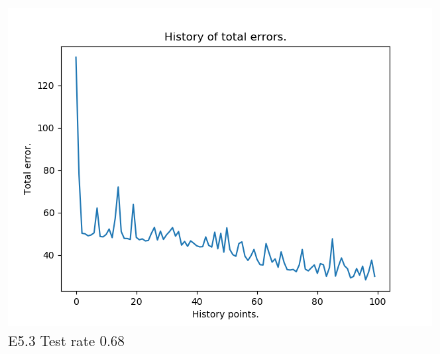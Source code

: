 \documentclass{classrep}
\begin{document}
\begin{figure}[H]
\begin{minipage}{0.5\linewidth}
				\centering
				\includegraphics[scale=0.25]{seeds_nn_l8.png}
				\caption{E5.3 Test rate  0.68}
				\label{E5.3}
			\end{minipage}
		\end{figure}
		\FloatBarrier
\end{document}

